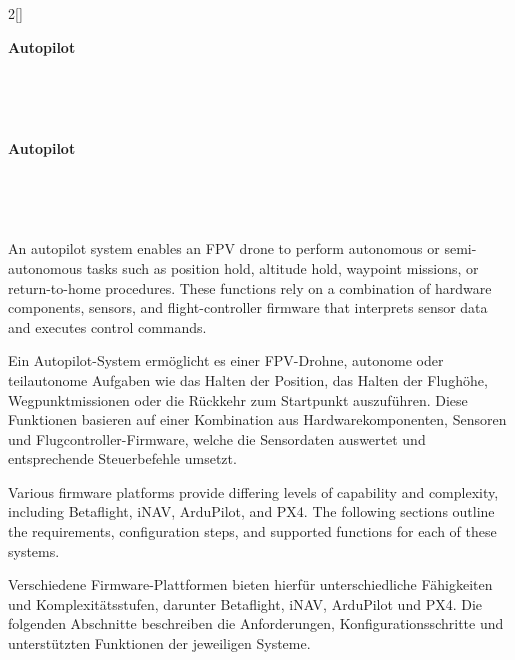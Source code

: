 \renewcommand{\deutschertitel}{Autopilot}
\renewcommand{\englischertitel}{Autopilot}
\chapter[\texorpdfstring{\protect{\vspace{2pt}\englischertitel}}{\englischertitel}]{}
\kapitel{\deutschertitel}
\thispagestyle{empty}

\label{KapitelAutopilot}

\begin{paracol}{2}[]

{\raggedright\huge\bfseries\sffamily \englischertitel \par\ } \\[1.8ex]

\switchcolumn

{\raggedright\huge\bfseries\sffamily \deutschertitel \par\ } \\[1.8ex]

\coleng

An autopilot system enables an FPV drone to perform autonomous or semi-autonomous tasks such as position hold, altitude hold, waypoint missions, or return-to-home procedures. These functions rely on a combination of hardware components, sensors, and flight-controller firmware that interprets sensor data and executes control commands. 

\colger

Ein Autopilot-System ermöglicht es einer FPV-Drohne, autonome oder teilautonome Aufgaben wie das Halten der Position, das Halten der Flughöhe, Wegpunktmissionen oder die Rückkehr zum Startpunkt auszuführen. Diese Funktionen basieren auf einer Kombination aus Hardwarekomponenten, Sensoren und Flugcontroller-Firmware, welche die Sensordaten auswertet und entsprechende Steuerbefehle umsetzt. 

\coleng

Various firmware platforms provide differing levels of capability and complexity, including Betaflight, iNAV, ArduPilot, and PX4. The following sections outline the requirements, configuration steps, and supported functions for each of these systems.

\colger

Verschiedene Firmware-Plattformen bieten hierfür unterschiedliche Fähigkeiten und Komplexitätsstufen, darunter Betaflight, iNAV, ArduPilot und PX4. Die folgenden Abschnitte beschreiben die Anforderungen, Konfigurationsschritte und unterstützten Funktionen der jeweiligen Systeme.


\end{paracol}
